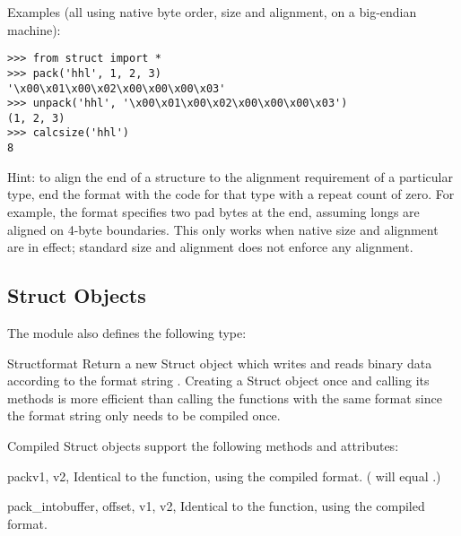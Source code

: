 Examples (all using native byte order, size and alignment, on a
big-endian machine):

\begin{verbatim}
>>> from struct import *
>>> pack('hhl', 1, 2, 3)
'\x00\x01\x00\x02\x00\x00\x00\x03'
>>> unpack('hhl', '\x00\x01\x00\x02\x00\x00\x00\x03')
(1, 2, 3)
>>> calcsize('hhl')
8
\end{verbatim}

Hint: to align the end of a structure to the alignment requirement of
a particular type, end the format with the code for that type with a
repeat count of zero.  For example, the format 
specifies two pad bytes at the end, assuming longs are aligned on
4-byte boundaries.  This only works when native size and alignment are
in effect; standard size and alignment does not enforce any alignment.

\begin{seealso}
\end{seealso}

\subsection{Struct Objects \label{struct-objects}}

The  module also defines the following type:

\begin{classdesc}{Struct}{format}
  Return a new Struct object which writes and reads binary data according to
  the format string .  Creating a Struct object once and calling
  its methods is more efficient than calling the  functions
  with the same format since the format string only needs to be compiled once.

\end{classdesc}

Compiled Struct objects support the following methods and attributes:

\begin{methoddesc}[Struct]{pack}{v1, v2, \moreargs}
  Identical to the  function, using the compiled format.
  ( will equal .)
\end{methoddesc}

\begin{methoddesc}[Struct]{pack_into}{buffer, offset, v1, v2, \moreargs}
  Identical to the  function, using the compiled format.
\end{methoddesc}

